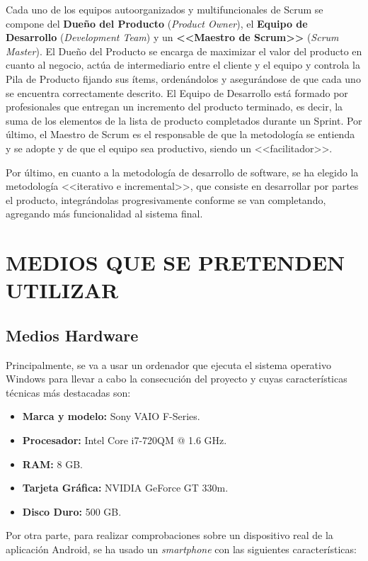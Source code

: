 \documentclass{pre-tfg}
\begin{document}
Cada uno de los equipos autoorganizados y multifuncionales de Scrum se compone del \textbf{Dueño del Producto} (\textit{Product Owner}), el \textbf{Equipo de Desarrollo} (\textit{Development Team}) y un \textbf{<<Maestro de Scrum>>} (\textit{Scrum Master}). El Dueño del Producto se encarga de maximizar el valor del producto en cuanto al negocio, actúa de intermediario entre el cliente y el equipo y controla la Pila de Producto fijando sus ítems, ordenándolos y asegurándose de que cada uno se encuentra correctamente descrito. El Equipo de Desarrollo está formado por profesionales que entregan un incremento del producto terminado, es decir, la suma de los elementos de la lista de producto completados durante un Sprint. Por último, el Maestro de Scrum es el responsable de que la metodología se entienda y se adopte y de que el equipo sea productivo, siendo un <<facilitador>>. 

Por último, en cuanto a la metodología de desarrollo de software, se ha elegido la metodología <<iterativo e incremental>>, que consiste en desarrollar por partes el producto, integrándolas progresivamente conforme se van completando, agregando más funcionalidad al sistema final.

\section{MEDIOS QUE SE PRETENDEN UTILIZAR}

\subsection{Medios Hardware}
Principalmente, se va a usar un ordenador que ejecuta el sistema operativo Windows para llevar a cabo la consecución del proyecto y cuyas características técnicas más destacadas son:

\begin{itemize}
	\item \textbf{Marca y modelo:} Sony VAIO F-Series.
	\item \textbf{Procesador:} Intel\textregistered{ } Core\texttrademark{ } i7-720QM @ 1.6 GHz.
	\item \textbf{RAM:} 8 GB.
	\item \textbf{Tarjeta Gráfica:} NVIDIA GeForce GT 330m.
	\item \textbf{Disco Duro:} 500 GB.
\end{itemize}

Por otra parte, para realizar comprobaciones sobre un dispositivo real de la aplicación Android, se ha usado un \textit{smartphone} con las siguientes características:
\end{document}

